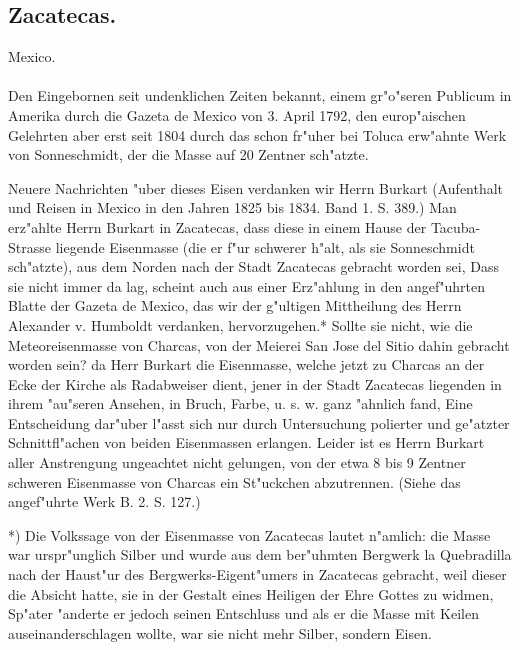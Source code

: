 \documentclass[a4paper, 11pt, oneside, polutonikogreek, german]{article}
\begin{document}
\subsection{Zacatecas.}
\begin{center}
\small
Mexico.
\end{center}
\paragraph{}
Den Eingebornen seit undenklichen Zeiten bekannt, einem gr"o"seren Publicum in Amerika durch die Gazeta de Mexico von 3. April 1792, den europ"aischen Gelehrten aber erst seit 1804 durch das schon fr"uher bei Toluca erw"ahnte Werk von Sonneschmidt, der die Masse auf 20 Zentner sch"atzte.

Neuere Nachrichten "uber dieses Eisen verdanken wir Herrn Burkart (Aufenthalt und Reisen in Mexico in den Jahren 1825 bis 1834. Band 1. S. 389.) Man erz"ahlte Herrn Burkart in Zacatecas, dass diese in einem Hause der Tacuba-Strasse liegende Eisenmasse (die er f"ur schwerer h"alt, als sie Sonneschmidt sch"atzte), aus dem Norden nach der Stadt Zacatecas gebracht worden sei, Dass sie nicht immer da lag, scheint auch aus einer Erz"ahlung in den angef"uhrten Blatte der Gazeta de Mexico, das wir der g"ultigen Mittheilung des Herrn Alexander v. Humboldt verdanken, hervorzugehen.* Sollte sie nicht, wie die Meteoreisenmasse von Charcas, von der Meierei San Jose del Sitio dahin gebracht worden sein? da Herr Burkart die Eisenmasse, welche jetzt zu Charcas an der Ecke der Kirche als Radabweiser dient, jener in der Stadt Zacatecas liegenden in ihrem "au"seren Ansehen, in Bruch, Farbe, u. s. w. ganz "ahnlich fand, Eine Entscheidung dar"uber l"asst sich nur durch Untersuchung polierter und ge"atzter Schnittfl"achen von beiden Eisenmassen erlangen. Leider ist es Herrn Burkart aller Anstrengung ungeachtet nicht gelungen, von der etwa 8 bis 9 Zentner schweren Eisenmasse von Charcas ein St"uckchen abzutrennen. (Siehe das angef"uhrte Werk B. 2. S. 127.)

*) Die Volkssage von der Eisenmasse von Zacatecas lautet n"amlich: die Masse war urspr"unglich Silber und wurde aus dem ber"uhmten Bergwerk la Quebradilla nach der Haust"ur des Bergwerks-Eigent"umers in Zacatecas gebracht, weil dieser die Absicht hatte, sie in der Gestalt eines Heiligen der Ehre Gottes zu widmen, Sp"ater "anderte er jedoch seinen Entschluss und als er die Masse mit Keilen auseinanderschlagen wollte, war sie nicht mehr Silber, sondern Eisen.
\end{document}
